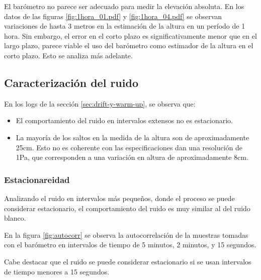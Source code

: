 \documentclass[main]{subfiles}
\begin{document}
El barómetro no parece ser adecuado para medir la elevación absoluta. En los datos de las figuras \ref{fig:1hora_01.pdf} y \ref{fig:1hora_04.pdf} se observan variaciones de hasta 3 metros en la estimación de la altura en un período de 1 hora. Sin embargo, el error en el corto plazo es significativamente menor que en el largo plazo, parece viable el uso del barómetro como estimador de la altura en el corto plazo. Esto se analiza más adelante.

\subsection{Caracterización del ruido}
\label{sec:caract-ruido}

En los logs de la sección \ref{sec:drift-y-warm-up}, se observa que:
\begin{itemize}
\item El comportamiento del ruido en intervalos extensos no es estacionario.
\item La mayoría de los saltos en la medida de la altura son de aproximadamente 25cm. Esto no es coherente con las especificaciones dan una resolución de 1Pa, que corresponden a una variación en altura de aproximadamente 8cm.
\end{itemize}

\subsubsection{Estacionareidad}

Analizando el ruido en intervalos más pequeños, donde el proceso se puede considerar estacionario, el comportamiento del ruido es muy similar al del ruido blanco.

En la figura \ref{fig:autocorr} se observa la autocorrelación de la muestras tomadas con el barómetro en intervalos de tiempo de 5 minutos, 2 minutos, y 15 segundos.

Cabe destacar que el ruido se puede considerar estacionario si se usan intervalos de tiempo menores a 15 segundos.
\end{document}
